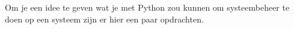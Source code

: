 Om je een idee te geven wat je met Python zou kunnen om systeembeheer te doen op een systeem zijn er hier een paar opdrachten.
